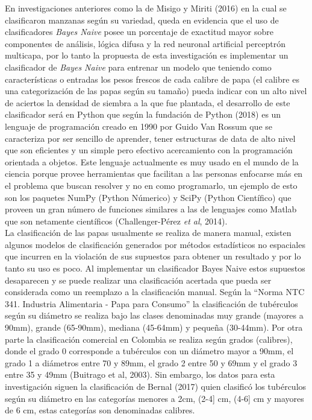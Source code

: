En investigaciones anteriores como la de Misigo y Miriti (2016) en la cual se clasificaron manzanas según su variedad, queda en evidencia que el uso de clasificadores \textit{Bayes Naive} posee un porcentaje de exactitud mayor sobre componentes de análisis, lógica difusa y la red neuronal artificial perceptrón multicapa, por lo tanto la propuesta de esta investigación es implementar un clasificador de \textit{Bayes Naive} para entrenar un modelo que teniendo como características o entradas los pesos frescos de cada calibre de papa (el calibre es una categorización de las papas según su tamaño) pueda indicar con un alto nivel de aciertos la densidad de siembra a la que fue plantada, el desarrollo de este clasificador será en Python que según la fundación de Python (2018) es un lenguaje de programación creado en 1990 por Guido Van Rossum que se caracteriza por ser sencillo de aprender, tener estructuras de data de alto nivel que son eficientes y un simple pero efectivo acercamiento con la programación orientada a objetos. Este lenguaje actualmente es muy usado en el mundo de la ciencia porque provee herramientas que facilitan a las personas enfocarse más en el problema que buscan resolver y no en como programarlo, un ejemplo de esto son los paquetes NumPy (Python Númerico) y SciPy (Python Científico) que proveen un gran número de funciones similares a las de lenguajes como Matlab que son netamente científicos (Challenger-Pérez \textit{et al}, 2014).\\

La clasificación de las papas usualmente se realiza de manera manual, existen algunos modelos de clasificación generados por métodos estadísticos no espaciales que incurren en la violación de sus supuestos para obtener un resultado y por lo tanto su uso es poco. Al implementar un clasificador Bayes Naive estos supuestos desaparecen y se puede realizar una clasificación acertada que pueda ser considerada como un reemplazo a la clasificación manual. Según la "`Norma NTC 341. Industria Alimentaria - Papa para Consumo"' la clasificación de tubérculos según su diámetro se realiza bajo las clases denominadas muy grande (mayores a 90mm), grande (65-90mm), mediana (45-64mm) y pequeña (30-44mm). Por otra parte la clasificación comercial en Colombia se realiza según grados (calibres), donde el grado 0 corresponde a tubérculos con un diámetro mayor a 90mm, el grado 1 a diámetros entre 70 y 89mm, el grado 2 entre 50 y 69mm y el grado 3 entre 35 y 49mm (Buitrago et al, 2003). Sin embargo, los datos para esta investigación siguen la clasificación de Bernal (2017) quien clasificó los tubérculos según su diámetro en las categorías menores a 2cm, (2-4] cm, (4-6] cm y mayores de 6 cm, estas categorías son denominadas calibres.\\

